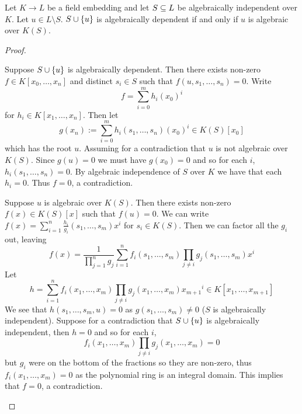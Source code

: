 \begin{prop}
    Let $K \to L$ be a field embedding and let $S \subseteq L$ be algebraically
    independent over $K$.
    Let $u \in L \setminus S$.
    $S \cup \left\{u\right\}$ is algebraically dependent if and only if $u$
    is algebraic over $K(S)$.
\end{prop}
\begin{proof}
    \begin{forward}
        Suppose $S \cup \left\{u\right\}$ is algebraically dependent.
        Then there exists non-zero $f \in K[x_0, \dots, x_n]$ 
        and distinct $s_i \in S$
        such that $f(u, s_1, \dots, s_n) = 0$.
        Write \[f = \sum_{i = 0}^m h_i (x_0)^i\]
        for $h_i \in K[x_1, \dots, x_n]$.
        Then let 
        \[g(x_n):= \sum_{i = 0}^m h_i(s_1, \dots, s_n) (x_0)^i \in K(S)[x_0]\]
        which has the root $u$.
        Assuming for a contradiction that $u$ is not algebraic over $K(S)$.
        Since $g(u) = 0$ we must have $g(x_0) = 0$ and so for each $i$,
        $h_i(s_1, \dots, s_n) = 0$.
        By algebraic independence of $S$ over $K$ we have that each $h_i = 0$.
        Thus $f = 0$, a contradiction.
    \end{forward}

    \begin{backward}
        Suppose $u$ is algebraic over $K(S)$. 
        Then there exists non-zero 
        $f(x) \in K(S)[x]$ such that $f(u) = 0$.
        We can write 
        $f(x) = \sum_{i = 1}^n \frac{h_i}{g_i}(s_1, \dots , s_m) x^i$
        for $s_i \in K(S)$.
        Then we can factor all the $g_i$ out, 
        leaving
        \[f(x) = \frac{1}{\prod_{j = 1}^n g_j}
        \sum_{i = 1}^n f_i(s_1, \dots , s_m)
        \prod_{j \ne i} g_j (s_1, \dots , s_m) x^i\]
        Let \[h = \sum_{i = 1}^n f_i(x_1, \dots , x_m)
        \prod_{j \ne i} g_j (x_1, \dots , x_m) {x_{m+1}}^i \in 
        K[x_1, \dots, x_{m+1}]\]
        We see that $h(s_1, \dots, s_m, u) = 0$ as $g(s_1, \dots, s_m) \ne 0$
        ($S$ is algebraically independent).
        Suppose for a contradiction that $S \cup \left\{u\right\}$
        is algebraically independent, then $h = 0$ and so 
        for each $i$, 
        \[f_i(x_1, \dots , x_m) \prod_{j \ne i} g_j (x_1, \dots , x_m) = 0\]
        but $g_i$ were on the bottom of the fractions so
        they are non-zero,
        thus $f_i(x_1, \dots , x_m)=0$ as the polynomial ring is an 
        integral domain.
        This implies that $f = 0$, a contradiction.
    \end{backward}
\end{proof}

